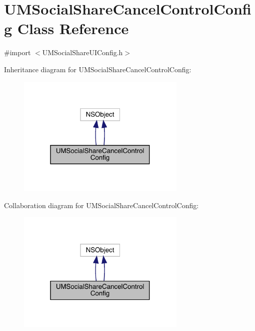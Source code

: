 \hypertarget{interface_u_m_social_share_cancel_control_config}{}\section{U\+M\+Social\+Share\+Cancel\+Control\+Config Class Reference}
\label{interface_u_m_social_share_cancel_control_config}


{\ttfamily \#import $<$U\+M\+Social\+Share\+U\+I\+Config.\+h$>$}



Inheritance diagram for U\+M\+Social\+Share\+Cancel\+Control\+Config\+:\nopagebreak
\begin{figure}[H]
\begin{center}
\leavevmode
\includegraphics[width=229pt]{interface_u_m_social_share_cancel_control_config__inherit__graph}
\end{center}
\end{figure}


Collaboration diagram for U\+M\+Social\+Share\+Cancel\+Control\+Config\+:\nopagebreak
\begin{figure}[H]
\begin{center}
\leavevmode
\includegraphics[width=229pt]{interface_u_m_social_share_cancel_control_config__coll__graph}
\end{center}
\end{figure}
